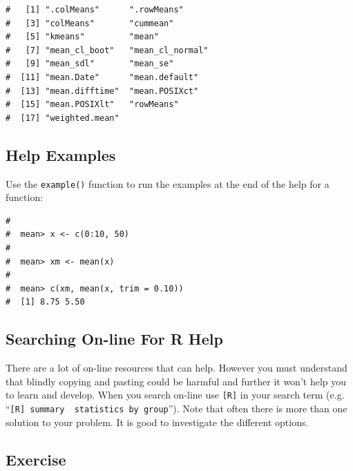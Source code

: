 \documentclass[a4paper,9pt,twocolumn,twoside,printwatermark=false]{pinp}
\begin{document}
\begin{ShadedResult}
\begin{verbatim}
#   [1] ".colMeans"      ".rowMeans"     
#   [3] "colMeans"       "cummean"       
#   [5] "kmeans"         "mean"          
#   [7] "mean_cl_boot"   "mean_cl_normal"
#   [9] "mean_sdl"       "mean_se"       
#  [11] "mean.Date"      "mean.default"  
#  [13] "mean.difftime"  "mean.POSIXct"  
#  [15] "mean.POSIXlt"   "rowMeans"      
#  [17] "weighted.mean"
\end{verbatim}
\end{ShadedResult}

\subsection{Help Examples}\label{help-examples}

Use the \texttt{example()} function to run the examples at the end of
the help for a function:

\begin{Shaded}
\begin{Highlighting}[]
\end{Highlighting}
\end{Shaded}

\begin{ShadedResult}
\begin{verbatim}
#  
#  mean> x <- c(0:10, 50)
#  
#  mean> xm <- mean(x)
#  
#  mean> c(xm, mean(x, trim = 0.10))
#  [1] 8.75 5.50
\end{verbatim}
\end{ShadedResult}

\subsection{Searching On-line For R
Help}\label{searching-on-line-for-r-help}

There are a lot of on-line resources that can help. However you must
understand that blindly copying and pasting could be harmful and further
it won't help you to learn and develop. When you search on-line use
\texttt{{[}R{]}} in your search term (e.g.
``\texttt{{[}R{]}\ summary\ \ statistics\ by\ group}''). Note that often
there is more than one solution to your problem. It is good to
investigate the different options.

\subsection{Exercise}\label{exercise}
\end{document}
